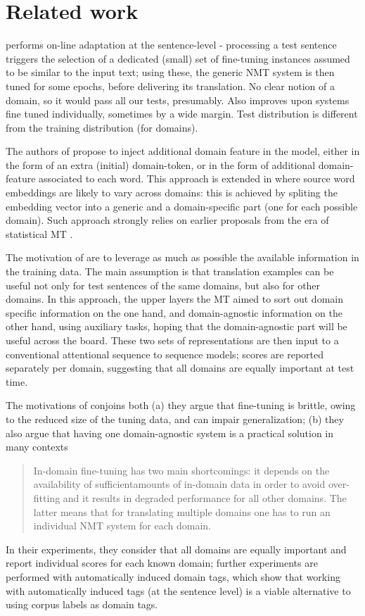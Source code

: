 \documentclass[11pt]{article}
\begin{document}
\section{Related work \label{sec:related}}

\cite{Farajian17multidomain} performs on-line adaptation at the sentence-level - processing a test sentence triggers the selection of a dedicated (small) set of fine-tuning instances assumed to be similar to the input text; using these, the generic NMT system is then tuned for some epochs, before delivering its translation. No clear notion of a domain, so it would pass all our tests, presumably.  Also improves upon systems fine tuned individually, sometimes by a wide margin. Test distribution is different from the training distribution (for domains). 

The authors of \cite{Kobus17domaincontrol} propose to inject additional domain feature in the model, either in the form of an extra (initial) domain-token, or in the form of additional domain-feature associated to each word. This approach is extended in \cite{Pham19generic} where source word embeddings are likely to vary across domains: this is achieved by spliting the embedding vector into a generic and a domain-specific part (one for each possible domain). Such approach strongly relies on earlier proposals from the era of statistical MT \cite{Daume07frustratingly,Clark12onesystem}. 

The motivation of \cite{Zeng18multidomain,Su19exploring} are to leverage as much as possible the available information in the training data. The main assumption is that translation examples can be useful not only for test sentences of the same domains, but also for other domains. In this approach, the upper layers the MT aimed to sort out domain specific information on the one hand, and domain-agnostic information on the other hand, using auxiliary tasks, hoping that the domain-agnostic part will be useful across the board. These two sets of representations are then input to a conventional attentional sequence to sequence models; scores are reported separately per domain, suggesting that all domains are equally important at test time.

The motivations of \cite{Tars18multidomain} conjoins both (a) they argue that fine-tuning is brittle, owing to the reduced size of the tuning data, and can impair generalization; (b) they also argue that having one domain-agnostic system is a practical solution in many contexts
\begin{quote}
  In-domain fine-tuning has two main shortcomings: it depends on the availability of sufficientamounts of in-domain data in order to avoid over-fitting and it results in degraded performance for all other domains. The latter means that for translating multiple domains one has to run an individual NMT system for each domain.
\end{quote}
In their experiments, they consider that all domains are equally important and report individual scores for each known domain; further experiments are performed with automatically induced domain tags, which show that working with automatically induced tags (at the sentence level) is a viable alternative to using corpus labels as domain tags.
\end{document}
